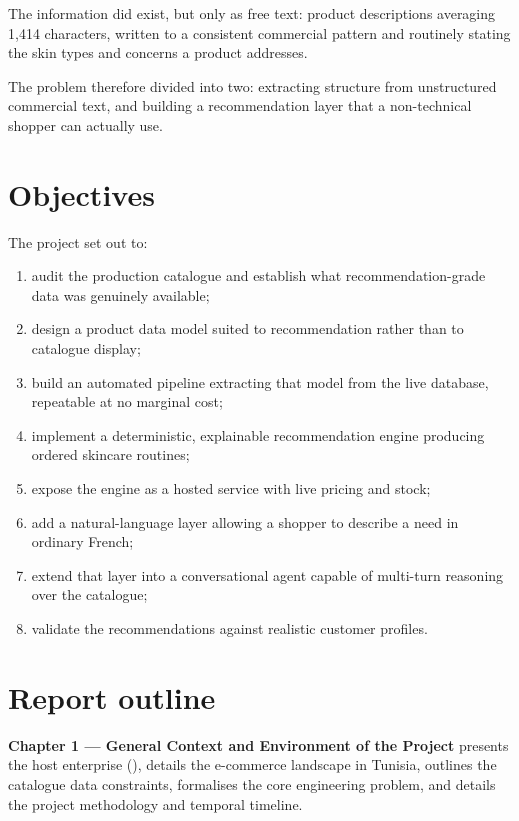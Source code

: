 The information did exist, but only as free text: product descriptions
averaging 1{,}414 characters, written to a consistent commercial pattern and
routinely stating the skin types and concerns a product addresses.

The problem therefore divided into two: extracting structure from unstructured
commercial text, and building a recommendation layer that a non-technical
shopper can actually use.

\section*{Objectives}

The project set out to:

\begin{enumerate}
  \item audit the production catalogue and establish what recommendation-grade
        data was genuinely available;
  \item design a product data model suited to recommendation rather than to
        catalogue display;
  \item build an automated pipeline extracting that model from the live
        database, repeatable at no marginal cost;
  \item implement a deterministic, explainable recommendation engine producing
        ordered skincare routines;
  \item expose the engine as a hosted service with live pricing and stock;
  \item add a natural-language layer allowing a shopper to describe a need in
        ordinary French;
  \item extend that layer into a conversational agent capable of multi-turn
        reasoning over the catalogue;
  \item validate the recommendations against realistic customer profiles.
\end{enumerate}

\section*{Report outline}

\textbf{Chapter 1 --- General Context and Environment of the Project} presents the host enterprise (\companyname), details the e-commerce landscape in Tunisia, outlines the catalogue data constraints, formalises the core engineering problem, and details the project methodology and temporal timeline.

